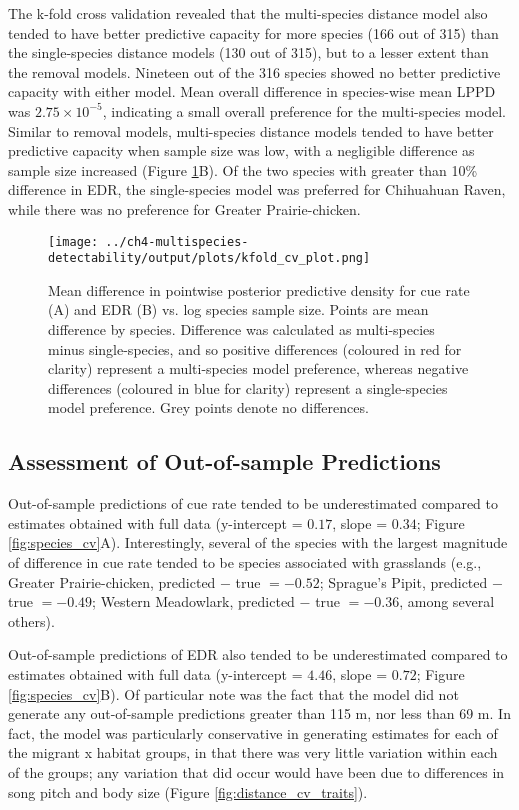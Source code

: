 \par The k-fold cross validation revealed that the multi-species distance model also tended to have better predictive capacity for more species (166 out of 315) than the single-species distance models (130 out of 315), but to a lesser extent than the removal models.
Nineteen out of the 316 species showed no better predictive capacity with either model.
Mean overall difference in species-wise mean LPPD was $2.75 \times 10^{-5}$, indicating a small overall preference for the multi-species model.
Similar to removal models, multi-species distance models tended to have better predictive capacity when sample size was low, with a negligible difference as sample size increased (Figure \ref{fig:cv}B).
Of the two species with greater than 10\% difference in EDR, the single-species model was preferred for Chihuahuan Raven, while there was no preference for Greater Prairie-chicken.

\begin{figure}[h]
	\texttt{[image: ../ch4-multispecies-detectability/output/plots/kfold\_cv\_plot.png]}
	\caption{Mean difference in pointwise posterior predictive density for cue rate (A) and EDR (B) vs. log species sample size. Points are mean difference by species. Difference was calculated as multi-species minus single-species, and so positive differences (coloured in red for clarity) represent a multi-species model preference, whereas negative differences (coloured in blue for clarity) represent a single-species model preference. Grey points denote no differences. }
	\label{fig:cv}
\end{figure}

\subsection{Assessment of Out-of-sample Predictions}

\par Out-of-sample predictions of cue rate tended to be underestimated compared to estimates obtained with full data (y-intercept = $0.17$, slope = $0.34$; Figure \ref{fig:species_cv}A).
Interestingly, several of the species with the largest magnitude of difference in cue rate tended to be species associated with grasslands (e.g., Greater Prairie-chicken, predicted $-$ true $= -0.52$; Sprague's Pipit, predicted $-$ true $= -0.49$; Western Meadowlark, predicted $-$ true $= -0.36$, among several others).

\par Out-of-sample predictions of EDR also tended to be underestimated compared to estimates obtained with full data (y-intercept = $4.46$, slope = $0.72$; Figure \ref{fig:species_cv}B).
Of particular note was the fact that the model did not generate any out-of-sample predictions greater than 115 m, nor less than 69 m.
In fact, the model was particularly conservative in generating estimates for each of the migrant x habitat groups, in that there was very little variation within each of the groups; any variation that did occur would have been due to differences in song pitch and body size (Figure \ref{fig:distance_cv_traits}).

